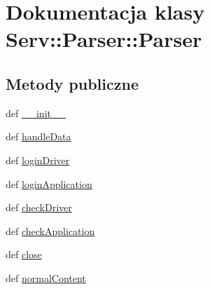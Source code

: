 \hypertarget{class_serv_1_1_parser_1_1_parser}{
\section{Dokumentacja klasy Serv::Parser::Parser}
\label{class_serv_1_1_parser_1_1_parser}
}
\subsection*{Metody publiczne}
\begin{DoxyCompactItemize}
\item 
def \hyperlink{class_serv_1_1_parser_1_1_parser_a8627f07c762983eff029ad167a021e38}{\_\-\_\-init\_\-\_\-}
\item 
def \hyperlink{class_serv_1_1_parser_1_1_parser_a060ed5ba3cbf55b63ecc3f3aa006da04}{handleData}
\item 
def \hyperlink{class_serv_1_1_parser_1_1_parser_ae092cef5abd35ec04fa61e71377e1303}{loginDriver}
\item 
def \hyperlink{class_serv_1_1_parser_1_1_parser_aec3286787a7c8642127416c77e1c2c8f}{loginApplication}
\item 
def \hyperlink{class_serv_1_1_parser_1_1_parser_aa6c504eb2ef2712d8f05cec0e94f3eba}{checkDriver}
\item 
def \hyperlink{class_serv_1_1_parser_1_1_parser_a8c0d6b83193d0e972e50887c7640181d}{checkApplication}
\item 
def \hyperlink{class_serv_1_1_parser_1_1_parser_ab6aa6195abf7a68df644640a8e4fd263}{close}
\item 
def \hyperlink{class_serv_1_1_parser_1_1_parser_adc1da4d6ff7eb9dbc114f8a426274aa0}{normalContent}
\end{DoxyCompactItemize}
